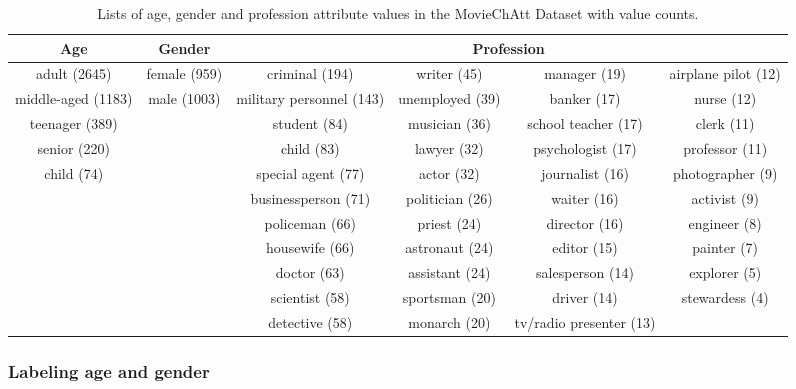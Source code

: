 \begin{table}[ht!]\sffamily
\centering
\begin{adjustbox}{width=0.95\textwidth}
\begin{tabular}{cccccc}
\textbf{Age}       & \textbf{Gender}          & \multicolumn{4}{c}{\textbf{Profession}}  \\ \toprule
adult (2645)       & female (959) & criminal (194)           & writer (45)     & manager (19)            & airplane pilot (12) \\
middle-aged (1183) & male (1003)  & military personnel (143) & unemployed (39) & banker (17)             & nurse (12)          \\
teenager (389)     &          & student (84)             & musician (36)   & school teacher (17)     & clerk (11)          \\
senior (220)       &          & child (83)               & lawyer (32)     & psychologist (17)       & professor (11)      \\
child (74)         &          & special agent (77)       & actor (32)      & journalist (16)         & photographer (9)    \\
                   &          & businessperson (71)      & politician (26) & waiter (16)             & activist (9)        \\
                   &          & policeman (66)           & priest (24)     & director (16)           & engineer (8)        \\
                   &          & housewife (66)           & astronaut (24)  & editor (15)             & painter (7)         \\
                   &          & doctor (63)              & assistant (24)  & salesperson (14)        & explorer (5)        \\
                   &          & scientist (58)           & sportsman (20)  & driver (14)             & stewardess (4)      \\
                   &          & detective (58)           & monarch (20)    & tv/radio presenter (13) &  
\end{tabular}
\end{adjustbox}
\caption{Lists of age, gender and profession attribute values in the MovieChAtt Dataset with value counts.}
\label{moviechatt}
\end{table}

\subsubsection{Labeling age and gender} 

